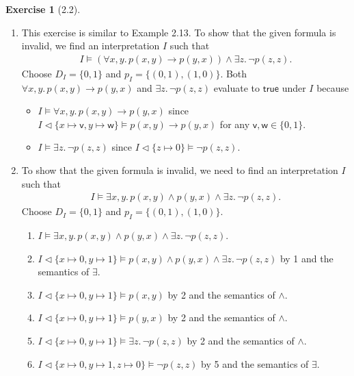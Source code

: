 \documentclass[12pt, psamsfonts]{amsart}
\theoremstyle{definition}
\newtheorem*{exer}{Exercise}
\theoremstyle{remark}
\numberwithin{equation}{subsection}
\begin{document}
\begin{exer}[2.2]
    $ $
    \begin{enumerate}[label=(\alph*)]
        \item
            This exercise is similar to Example 2.13.
            To show that the given formula is invalid, we find an interpretation $I$ such that
            \begin{align*}
                I \models (\forall x, y.\, p(x, y) \rightarrow p(y, x)) \land \exists z.\, \neg p(z, z).
            \end{align*}
            Choose $D_I = \{ 0, 1 \}$ and $p_I = \{ (0, 1), (1, 0) \}$.
            Both $\forall x, y.\, p(x, y) \rightarrow p(y, x)$ and $\exists z.\, \neg p(z, z)$ evaluate to $\textsf{true}$ under $I$ because
            \begin{itemize}
                \item
                    $I \models \forall x, y.\, p(x, y) \rightarrow p(y, x)$ since $I \vartriangleleft \{ x \mapsto \textsf{v}, y \mapsto \textsf{w} \} \models p(x, y) \rightarrow p(y, x)$ for any $\textsf{v}, \textsf{w} \in \{ 0, 1 \}$.
                \item
                    $I \models \exists z.\, \neg p(z, z)$ since $I \vartriangleleft \{ z \mapsto 0 \} \models \neg p(z, z)$.
            \end{itemize}
        \item
            To show that the given formula is invalid, we need to find an interpretation $I$ such that
            \begin{align*}
                I \models \exists x, y.\, p(x, y) \land p(y, x) \land \exists z.\, \neg p(z, z).
            \end{align*}
            Choose $D_I = \{ 0, 1 \}$ and $p_I = \{ (0, 1), (1, 0) \}$.
            \begin{enumerate}[label=\arabic*.]
                \item %
                    $I \models \exists x, y.\, p(x, y) \land p(y, x) \land \exists z.\, \neg p(z, z)$.
                \item %
                    $I \vartriangleleft \{ x \mapsto 0, y \mapsto 1 \} \models p(x, y) \land p(y, x) \land \exists z.\, \neg p(z, z)$ by 1 and the semantics of $\exists$.
                \item %
                    $I \vartriangleleft \{ x \mapsto 0, y \mapsto 1 \} \models p(x, y)$ by 2 and the semantics of $\land$.
                \item %
                    $I \vartriangleleft \{ x \mapsto 0, y \mapsto 1 \} \models p(y, x)$ by 2 and the semantics of $\land$.
                \item %
                    $I \vartriangleleft \{ x \mapsto 0, y \mapsto 1 \} \models \exists z.\, \neg p(z, z)$ by 2 and the semantics of $\land$.
                \item %
                    $I \vartriangleleft \{ x \mapsto 0, y \mapsto 1, z \mapsto 0 \} \models \neg p(z, z)$ by 5 and the semantics of $\exists$.
            \end{enumerate}
    \end{enumerate}
\end{exer}
\end{document}
